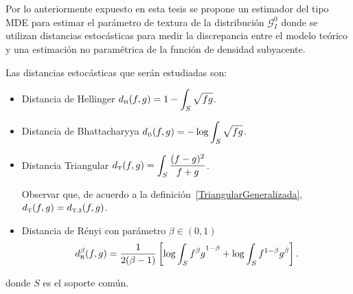 Por lo anteriormente expuesto en esta tesis se propone un estimador del tipo MDE para estimar el parámetro de textura de la distribución $\mathcal{G}_I^{0}$ donde se utilizan distancias estocásticas para medir la discrepancia entre el modelo teórico y  una estimación no paramétrica de la función de densidad subyacente. 


%
%
%

Las distancias estocásticas que serán estudiadas son:

\begin{itemize}
	\item Distancia de Hellinger $d_\text{\tiny H}(f,g)=1-\displaystyle{\int_{S}\sqrt{fg}}$.
	
	\item Distancia de Bhattacharyya $d_\text{\tiny B}(f,g)=-\log\displaystyle{\int_{S}\sqrt{fg }}$.
	
	\item Distancia Triangular $d_\text{\tiny T}(f,g)=\displaystyle{\int_{S}\frac{(f-g)^2}{f+g}}$.
	
	Observar que, de acuerdo a la definición~\ref{TriangularGeneralizada}, $d_\text{\tiny T}(f,g)=d_{\text{\tiny{T,2}}}(f,g)$.
	
	\item Distancia de R\'enyi con parámetro $\beta\in(0,1)$
	$$
	d_\text{\tiny R}^{\beta}(f,g)=\frac{1}{2(\beta-1)}\left[\log\displaystyle{\int_{S}{f^{\beta}g}^{1-\beta}}+\log\displaystyle{\int_{S}f^{1-\beta}g^{\beta}}\right].
	$$
\end{itemize}
donde $S$ es el soporte común.

